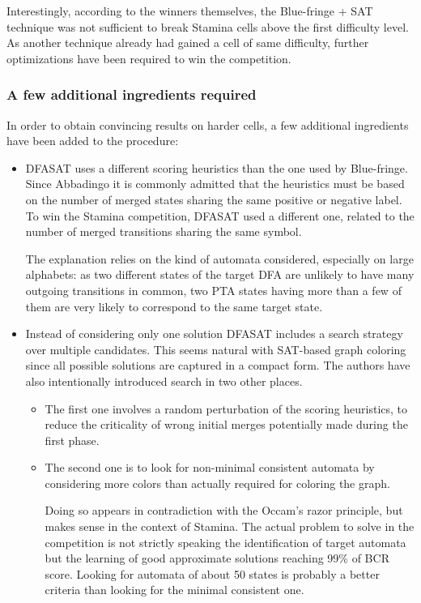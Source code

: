 Interestingly, according to the winners themselves, the Blue-fringe + SAT technique was not sufficient to break Stamina cells above the first difficulty level. As another technique already had gained a cell of same difficulty, further optimizations have been required to win the competition.

\subsubsection*{A few additional ingredients required}

In order to obtain convincing results on harder cells, a few additional ingredients have been added to the procedure:

\begin{itemize}
\item DFASAT uses a different scoring heuristics than the one used by Blue-fringe. Since Abbadingo it is commonly admitted that the heuristics must be based on the number of merged states sharing the same positive or negative label. To win the Stamina competition, DFASAT used a different one, related to the number of merged transitions sharing the same symbol. 

The explanation relies on the kind of automata considered, especially on large alphabets: as two different states of the target DFA are unlikely to have many outgoing transitions in common, two PTA states having more than a few of them are very likely to correspond to the same target state.

\item Instead of considering only one solution DFASAT includes a search strategy over multiple candidates. This seems natural with SAT-based graph coloring since all possible solutions are captured in a compact form. The authors have also intentionally introduced search in two other places. 
\begin{itemize}
\item The first one involves a random perturbation of the scoring heuristics, to reduce the criticality of wrong initial merges potentially made during the first phase. 
\item The second one is to look for non-minimal consistent automata by considering more colors than actually required for coloring the graph. 

Doing so appears in contradiction with the Occam's razor principle, but makes sense in the context of Stamina. The actual problem to solve in the competition is not strictly speaking the identification of target automata but the learning of good approximate solutions reaching 99\% of BCR score. Looking for automata of about 50 states is probably a better criteria than looking for the minimal consistent one.
\end{itemize}
\end{itemize}
